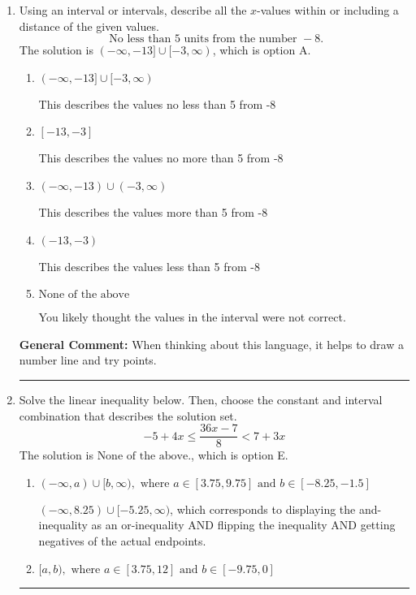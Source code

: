 \documentclass{extbook}[14pt]
\newcommand{\litem}[1]{\item #1

\rule{\textwidth}{0.4pt}}
\begin{document}
\begin{enumerate}
{\begin{enumerate}[label=\Alph*.]
You may have chosen this if you thought the inequality did not match the ends of the intervals.
\end{enumerate}

\textbf{General Comment:} Remember that less/greater than or equal to includes the endpoint, while less/greater do not. Also, remember that you need to flip the inequality when you multiply or divide by a negative.
}
\litem{
Using an interval or intervals, describe all the $x$-values within or including a distance of the given values.
\[ \text{ No less than } 5 \text{ units from the number } -8. \]The solution is \( (-\infty, -13] \cup [-3, \infty) \), which is option A.\begin{enumerate}[label=\Alph*.]
\item \( (-\infty, -13] \cup [-3, \infty) \)

This describes the values no less than 5 from -8
\item \( [-13, -3] \)

This describes the values no more than 5 from -8
\item \( (-\infty, -13) \cup (-3, \infty) \)

This describes the values more than 5 from -8
\item \( (-13, -3) \)

This describes the values less than 5 from -8
\item \( \text{None of the above} \)

You likely thought the values in the interval were not correct.
\end{enumerate}

\textbf{General Comment:} When thinking about this language, it helps to draw a number line and try points.
}
\litem{
Solve the linear inequality below. Then, choose the constant and interval combination that describes the solution set.
\[ -5 + 4 x \leq \frac{36 x - 7}{8} < 7 + 3 x \]The solution is \( \text{None of the above.} \), which is option E.\begin{enumerate}[label=\Alph*.]
\item \( (-\infty, a) \cup [b, \infty), \text{ where } a \in [3.75, 9.75] \text{ and } b \in [-8.25, -1.5] \)

$(-\infty, 8.25) \cup [-5.25, \infty)$, which corresponds to displaying the and-inequality as an or-inequality AND flipping the inequality AND getting negatives of the actual endpoints.
\item \( [a, b), \text{ where } a \in [3.75, 12] \text{ and } b \in [-9.75, 0] \)


\end{enumerate}}
\end{enumerate}
\end{document}

